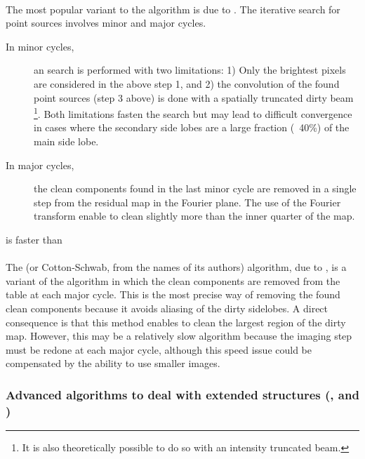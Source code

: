 \paragraph{}

The most popular variant to the  algorithm is due to
\cite{clark80}. The iterative search for point sources involves minor and
major cycles.
\begin{description}
\item[In minor cycles,] an  search is performed with two
  limitations: 1) Only the brightest pixels are considered in the above
  step 1, and 2) the convolution of the found point sources (step 3 above)
  is done with a spatially truncated dirty beam 
  \footnote{It is also theoretically possible to do so with an intensity truncated beam.}. 
  Both limitations fasten
  the search but may lead to difficult convergence in cases where the
  secondary side lobes are a large fraction (\eg\ 40\%) of the main side
  lobe.
\item[In major cycles,] the clean components found in the last minor cycle
  are removed in a single step from the residual map in the Fourier plane.
  The use of the Fourier transform enable to clean slightly more than the
  inner quarter of the map.
\end{description}
 is faster than 

\paragraph{}

The  (or Cotton-Schwab, from the names of its authors) 
algorithm, due to \citet{schwab84}, is a variant of the
 algorithm in which the clean components are removed from the
\uv{} table at each major cycle. This is the most precise way of removing
the found clean components because it avoids aliasing of the dirty
sidelobes. A direct consequence is that this method enables to clean the
largest region of the dirty map. However, this may be a relatively slow
algorithm because the imaging step must be redone at each major cycle,
although this speed issue could be compensated by the ability to
use smaller images.

\subsubsection{Advanced \clean{} algorithms to deal with extended
  structures (,  and )}

